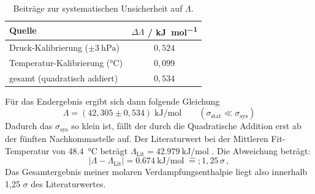 \documentclass{article}
\begin{document}
\begin{table}[htb]
  \centering
  \caption{Beiträge zur systematischen Unsicherheit auf $\Lambda$.}
  \begin{tabular}{lc}
    \toprule
    Quelle & $\Delta\Lambda$ / \si{\kilo\joule\per\mole} \\
    \midrule
    Druck-Kalibrierung ($\pm\SI{3}{\hecto\pascal}$) & $0{,}524$ \\
    Temperatur-Kalibrierung ($\si{\celsius}$) & $0{,}099$ \\
    \midrule
    gesamt (quadratisch addiert) & $0{,}534$ \\
    \bottomrule
  \end{tabular}
\end{table}
Für das Endergebnis ergibt sich dann folgende Gleichung
\begin{equation}
    \Lambda = (42,305 \pm 0,534)\;\si{\kilo\joule\per\mole}
    \qquad (\sigma_{\text{stat}} \ll \sigma_{\text{sys}})
\end{equation}
Dadurch das $\sigma_{\text{sys}}$ so klein ist, fällt der durch die Quadratische Addition erst ab der fünften Nachkommastelle auf.
Der Literaturwert bei der Mittleren Fit-Temperatur von \SI{48.4}{\celsius} beträgt $\Lambda_{\text{Lit}} = \SI{42.979}{\kilo\joule\per\mole}$ . Die Abweichung beträgt:
\begin{equation}
    |\Lambda-\Lambda_{\text{Lit}}| = \SI{0.674}{\kilo\joule\per\mole}
    \;\widehat{=};1,25\,\sigma\, ,
\end{equation}
Das Gesamtergebnis meiner molaren Verdampfungsenthalpie liegt also innerhalb 1,25 $\sigma$ des Literaturwertes.
\end{document}
